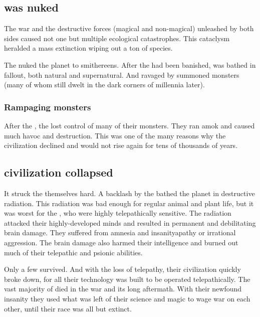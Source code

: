 \subsection{\Miith was nuked}
The war and the destructive forces (magical and non-magical) unleashed by both sides caused not one but multiple ecological catastrophes. 
This cataclysm heralded a mass extinction wiping out a ton of species. 

The \firstbanewar nuked the planet to smithereens. 
After the \banes had been banished, \Miith was bathed in fallout, both natural and supernatural. 
And ravaged by summoned monsters (many of whom still dwelt in the dark corners of \Miith millennia later). 





\subsubsection{Rampaging monsters}
After the \firstbanewar, the \ophidians lost control of many of their monsters. 
They ran amok and caused much havoc and destruction.
This was one of the many reasons why the \ophidian civilization declined and would not rise again for tens of thousands of years. 






\subsection{\Ophidian civilization collapsed}
It struck the \ophidians{} themselves hard. 
A backlash by the \banelords{} bathed the planet in destructive radiation. 
This radiation was bad enough for regular animal and plant life, but it was worst for the \ophidians, who were highly telepathically sensitive. 
The radiation attacked their highly-developed minds and resulted in permanent and debilitating brain damage. 
They suffered from amnesia and insanity\dash apathy or irrational aggression. 
The brain damage also harmed their intelligence and burned out much of their telepathic and psionic abilities. 

Only a few survived. 
And with the loss of telepathy, their civilization quickly broke down, for all their technology was built to be operated telepathically. 
The vast majority of \ophidians{} died in the war and its long aftermath. 
With their newfound insanity they used what was left of their science and magic to wage war on each other, until their race was all but extinct. 

